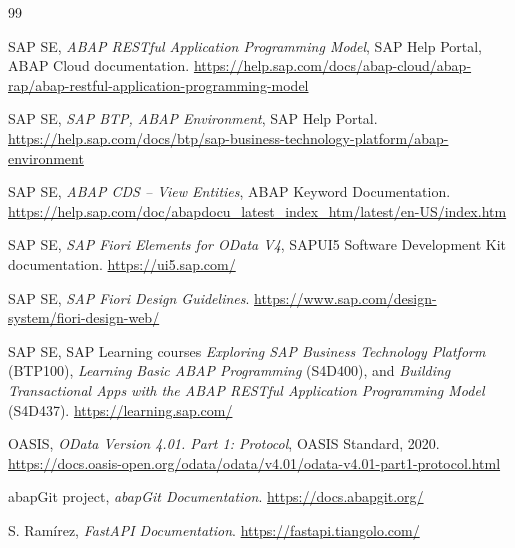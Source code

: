 \documentclass[12pt,a4paper,oneside]{book}
\begin{document}











\appendix








\begin{thebibliography}{99}
\raggedright %


SAP SE, \emph{ABAP RESTful Application Programming Model}, SAP Help Portal, ABAP Cloud documentation.
\url{https://help.sap.com/docs/abap-cloud/abap-rap/abap-restful-application-programming-model}

SAP SE, \emph{SAP BTP, ABAP Environment}, SAP Help Portal.
\url{https://help.sap.com/docs/btp/sap-business-technology-platform/abap-environment}

SAP SE, \emph{ABAP CDS -- View Entities}, ABAP Keyword Documentation.
\url{https://help.sap.com/doc/abapdocu_latest_index_htm/latest/en-US/index.htm}

SAP SE, \emph{SAP Fiori Elements for OData V4}, SAPUI5 Software Development Kit documentation.
\url{https://ui5.sap.com/}

SAP SE, \emph{SAP Fiori Design Guidelines}.
\url{https://www.sap.com/design-system/fiori-design-web/}

SAP SE, SAP Learning courses \emph{Exploring SAP Business Technology Platform} (BTP100), \emph{Learning Basic ABAP Programming} (S4D400), and \emph{Building Transactional Apps with the ABAP RESTful Application Programming Model} (S4D437).
\url{https://learning.sap.com/}

OASIS, \emph{OData Version 4.01. Part 1: Protocol}, OASIS Standard, 2020.
\url{https://docs.oasis-open.org/odata/odata/v4.01/odata-v4.01-part1-protocol.html}

abapGit project, \emph{abapGit Documentation}.
\url{https://docs.abapgit.org/}

S. Ram\'irez, \emph{FastAPI Documentation}.
\url{https://fastapi.tiangolo.com/}


\end{thebibliography}
\end{document}
